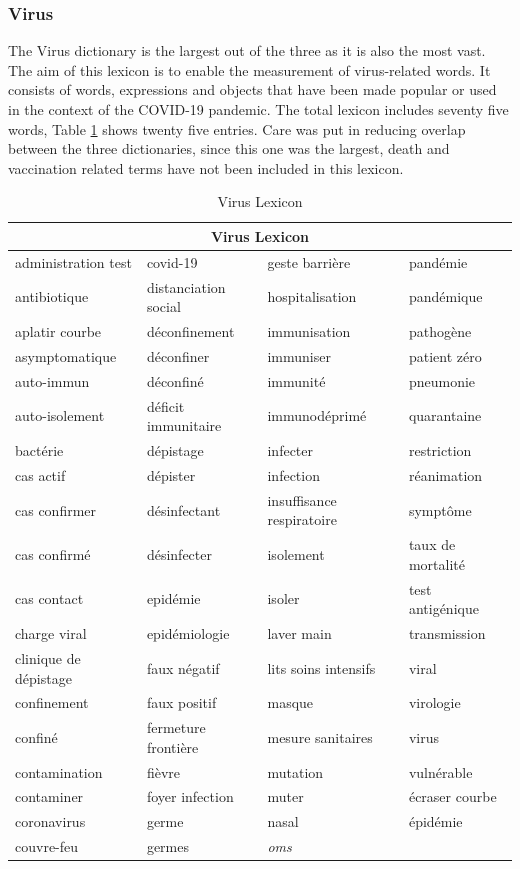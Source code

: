 \subsubsection{Virus}

The Virus dictionary is the largest out of the three as it is also the most vast. The aim of this lexicon is to enable the measurement of virus-related words. It consists of words, expressions and objects that have been made popular or used in the context of the COVID-19 pandemic. The total lexicon includes seventy five words, Table \ref{tab:virus lexicon} shows twenty five entries. Care was put in reducing overlap between the three dictionaries, since this one was the largest, death and vaccination related terms have not been included in this lexicon.


\begin{table}[H]
\centering
\begin{tabular}{@{}llll@{}}
\toprule
\multicolumn{4}{c}{\textbf{Virus Lexicon}} \\ \midrule
administration test & covid-19 & geste barrière & pandémie \\
antibiotique & distanciation social & hospitalisation & pandémique \\
aplatir courbe & déconfinement & immunisation & pathogène \\
asymptomatique & déconfiner & immuniser & patient zéro \\
auto-immun & déconfiné & immunité & pneumonie \\
auto-isolement & déficit immunitaire & immunodéprimé & quarantaine \\
bactérie & dépistage & infecter & restriction \\
cas actif & dépister & infection & réanimation \\
cas confirmer & désinfectant & insuffisance respiratoire & symptôme \\
cas confirmé & désinfecter & isolement & taux de mortalité \\
cas contact & epidémie & isoler & test antigénique \\
charge viral & epidémiologie & laver main & transmission \\
clinique de dépistage & faux négatif & lits soins intensifs & viral \\
confinement & faux positif & masque & virologie \\
confiné & fermeture frontière & mesure sanitaires & virus \\
contamination & fièvre & mutation & vulnérable \\
contaminer & foyer infection & muter & écraser courbe \\
coronavirus & germe & nasal & épidémie \\
couvre-feu & germes & \textit{oms} & \\
\bottomrule
\end{tabular}
\caption{Virus Lexicon}
\label{tab:virus lexicon}
\end{table}

